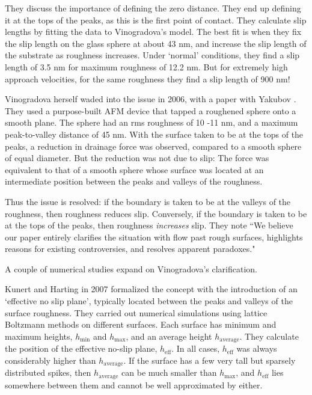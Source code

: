 \documentclass[a4paper]{report}
\begin{document}
They discuss the importance of defining the zero distance.  They end up defining it at the tops of the peaks, as this is the first point of contact.  They calculate slip lengths by fitting the data to Vinogradova's model.  The best fit is when they fix the slip length on the glass sphere at about 43 nm, and increase the slip length of the substrate as roughness increases.  Under `normal' conditions, they find a slip length of 3.5 nm for maximum roughness of 12.2 nm.  But for extremely high approach velocities, for the same roughness they find a slip length of 900 nm!

Vinogradova herself waded into the issue in 2006, with a paper with Yakubov \cite{VinogradovaYakubov2006}.  They used a purpose-built AFM device that tapped a roughened sphere onto a smooth plane.  The sphere had an rms roughness of 10 -11 nm, and a maximum peak-to-valley distance of 45 nm.  With the surface taken to be at the tops of the peaks, a reduction in drainage force was observed, compared to a smooth sphere of equal diameter.  But the reduction was not due to slip:  The force was equivalent to that of a smooth sphere whose surface was located at an intermediate position between the peaks and valleys of the roughness.

Thus the issue is resolved: if the boundary is taken to be at the valleys of the roughness, then roughness reduces slip.  Conversely, if the boundary is taken to be at the tops of the peaks, then roughness \emph{increases} slip.
They note ``We believe our paper entirely clarifies the situation with flow past rough surfaces, highlights reasons for existing controversies, and resolves apparent paradoxes." 

A couple of numerical studies expand on Vinogradova's clarification.

Kunert and Harting in 2007 \cite{KunertHarting2007} formalized the concept with the introduction of an `effective no slip plane', typically located between the peaks and valleys of the surface roughness.  They carried out numerical simulations using lattice Boltzmann methods on different surfaces.  Each surface has minimum and maximum heights, $h_{\mathrm{min}}$ and $h_{\mathrm{max}}$, and an average height $h_{\mathrm{average}}$.  They calculate the position of the effective no-slip plane, $h_{\mathrm{eff}}$.  In all cases, $h_{\mathrm{eff}}$ was always considerably higher than $h_{\mathrm{average}}$.  If the surface has a few very tall but sparsely distributed spikes, then $h_{\mathrm{average}}$ can be much smaller than $h_{\mathrm{max}}$, and $h_{\mathrm{eff}}$ lies somewhere between them and cannot be well approximated by either.
\end{document}
